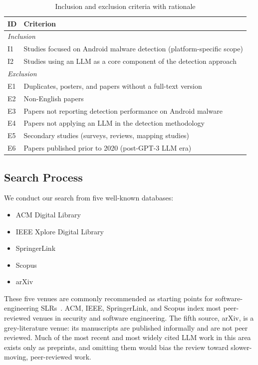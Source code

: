 \begin{table}[htbp]
\centering
\caption{Inclusion and exclusion criteria with rationale}
\label{tab:inclusion-exclusion}
\begin{tabularx}{\columnwidth}{lX}
\toprule
\textbf{ID} & \textbf{Criterion} \\
\midrule
\multicolumn{2}{l}{\textit{Inclusion}} \\
I1 & Studies focused on Android malware detection (platform-specific scope) \\
I2 & Studies using an LLM as a core component of the detection approach \\
\midrule
\multicolumn{2}{l}{\textit{Exclusion}} \\
E1 & Duplicates, posters, and papers without a full-text version \\
E2 & Non-English papers \\
E3 & Papers not reporting detection performance on Android malware \\
E4 & Papers not applying an LLM in the detection methodology \\
E5 & Secondary studies (surveys, reviews, mapping studies) \\
E6 & Papers published prior to 2020 (post-GPT-3 LLM era) \\
\bottomrule
\end{tabularx}
\end{table}

\subsection{Search Process}\label{sec:databases}

We conduct our search from five well-known databases:
\begin{itemize}
    \item ACM Digital Library
    \item IEEE Xplore Digital Library
    \item SpringerLink
    \item Scopus
    \item arXiv
\end{itemize}

These five venues are commonly recommended as starting points for software-engineering SLRs~\cite{kitchenham2007guidelines}. ACM, IEEE, SpringerLink, and Scopus index most peer-reviewed venues in security and software engineering. The fifth source, arXiv, is a grey-literature venue: its manuscripts are published informally and are not peer reviewed. Much of the most recent and most widely cited LLM work in this area exists only as preprints, and omitting them would bias the review toward slower-moving, peer-reviewed work.

